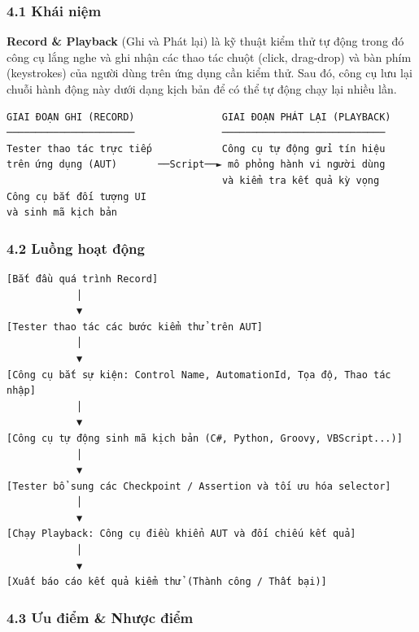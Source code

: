 \subsubsection{4.1 Khái niệm}

\textbf{Record & Playback} (Ghi và Phát lại) là kỹ thuật kiểm thử tự động trong đó công cụ lắng nghe và ghi nhận các thao tác chuột (click, drag-drop) và bàn phím (keystrokes) của người dùng trên ứng dụng cần kiểm thử. Sau đó, công cụ lưu lại chuỗi hành động này dưới dạng kịch bản để có thể tự động chạy lại nhiều lần.

\begin{lstlisting}
GIAI ĐOẠN GHI (RECORD)               GIAI ĐOẠN PHÁT LẠI (PLAYBACK)
──────────────────────               ────────────────────────────
Tester thao tác trực tiếp            Công cụ tự động gửi tín hiệu
trên ứng dụng (AUT)       ──Script──► mô phỏng hành vi người dùng
                                     và kiểm tra kết quả kỳ vọng
Công cụ bắt đối tượng UI
và sinh mã kịch bản
\end{lstlisting}


\subsubsection{4.2 Luồng hoạt động}

\begin{lstlisting}
[Bắt đầu quá trình Record]
            │
            ▼
[Tester thao tác các bước kiểm thử trên AUT]
            │
            ▼
[Công cụ bắt sự kiện: Control Name, AutomationId, Tọa độ, Thao tác nhập]
            │
            ▼
[Công cụ tự động sinh mã kịch bản (C#, Python, Groovy, VBScript...)]
            │
            ▼
[Tester bổ sung các Checkpoint / Assertion và tối ưu hóa selector]
            │
            ▼
[Chạy Playback: Công cụ điều khiển AUT và đối chiếu kết quả]
            │
            ▼
[Xuất báo cáo kết quả kiểm thử (Thành công / Thất bại)]
\end{lstlisting}


\subsubsection{4.3 Ưu điểm \& Nhược điểm}

